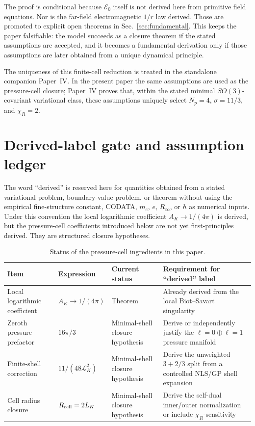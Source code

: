 \documentclass[11pt]{article}
\newcommand{\Ezero}{\mathcal E_0}
\begin{document}
The proof is conditional because \(\Ezero\) itself is not derived here from primitive field
equations.  Nor is the far-field electromagnetic \(1/r\) law derived.  Those are promoted to
explicit open theorems in Sec.~\ref{sec:fundamental}.  This keeps the paper falsifiable:
the model succeeds as a closure theorem if the stated assumptions are accepted, and it becomes
a fundamental derivation only if those assumptions are later obtained from a unique dynamical
principle.



The uniqueness of this finite-cell reduction is treated in the standalone
companion Paper~IV.  In the present paper the same assumptions are used as the
pressure-cell closure; Paper~IV proves that, within the stated minimal
\(SO(3)\)-covariant variational class, these assumptions uniquely select
\(N_p=4\), \(\sigma=11/3\), and \(\chi_R=2\).

\section{Derived-label gate and assumption ledger}
\label{sec:derived-label-gate}

The word ``derived'' is reserved here for quantities obtained from a stated
variational problem, boundary-value problem, or theorem without using the
empirical fine-structure constant, CODATA, \(m_e\), \(e\), \(R_\infty\), or
\(\hbar\) as numerical inputs.  Under this convention the local logarithmic
coefficient \(A_K\to1/(4\pi)\) is derived, but the pressure-cell coefficients
introduced below are not yet first-principles derived.  They are structured
closure hypotheses.

\begin{table}[h]
\centering
\caption{Status of the pressure-cell ingredients in this paper.}
\begin{tabular}{@{}llll@{}}
\toprule
Item & Expression & Current status & Requirement for ``derived'' label\\
\midrule
Local logarithmic coefficient &
\(A_K\to1/(4\pi)\) &
Theorem &
Already derived from the local Biot--Savart singularity\\
Zeroth pressure prefactor &
\(16\pi/3\) &
Minimal-shell closure hypothesis &
Derive or independently justify the \(\ell=0\oplus\ell=1\) pressure manifold\\
Finite-shell correction &
\(11/(48\mathcal L_K^2)\) &
Minimal-shell closure hypothesis &
Derive the unweighted \(3+2/3\) split from a controlled NLS/GP shell expansion\\
Cell radius closure &
\(R_{\rm cell}=2L_K\) &
Minimal-shell closure hypothesis &
Derive the self-dual inner/outer normalization or include \(\chi_R\)-sensitivity\\
\bottomrule
\end{tabular}
\label{tab:derived-label-ledger}
\end{table}
\end{document}
